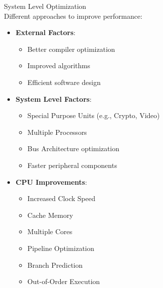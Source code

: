 \begin{concept}{System Level Optimization}\\
Different approaches to improve performance:
\begin{itemize}
  \item \textbf{External Factors}:
    \begin{itemize}
      \item Better compiler optimization
      \item Improved algorithms
      \item Efficient software design
    \end{itemize}
  \item \textbf{System Level Factors}:
    \begin{itemize}
      \item Special Purpose Units (e.g., Crypto, Video)
      \item Multiple Processors
      \item Bus Architecture optimization
      \item Faster peripheral components
    \end{itemize}
  \item \textbf{CPU Improvements}:
    \begin{itemize}
      \item Increased Clock Speed
      \item Cache Memory
      \item Multiple Cores
      \item Pipeline Optimization
      \item Branch Prediction
      \item Out-of-Order Execution
    \end{itemize}
\end{itemize}
\end{concept}

